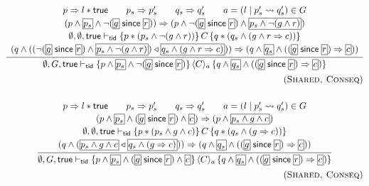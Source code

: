 \begin{figure*}
\footnotesize
\[
\begin{array}{@{}c@{}}
\infer
{
\emptyset,G,\true \vdash_\ltid 
\{p  \land \shared{p_s} \land\neg(\shared{g} \since \shared{r}) \} \,
\langle C\rangle_a \,
\{ q \land \shared{q_s}  \land ((\shared{g} \since \shareds{r}) \Rightarrow \shareds{c} ) \}    
}
{
\begin{array}{c}
p \Rightarrow l * \true
\qquad
p_s \Rightarrow p'_s
\qquad
q_s \Rightarrow q'_s
\qquad
a = (l \mid p'_s \leadsto q'_s) \in G 
\\[2pt]
(p  \land \shared{p_s} \land \neg(\shared{g} \since \shared{r})) 
\Rightarrow 
(p  \land \neg(\shared{g} \since \shared{r}) \land 
\shared{
 p_s 
 \land 
 \neg (g  \land r)
})
\\[2pt]
\emptyset,\emptyset,\true \vdash_\ltid 
\{ p * (p_s \land  \neg(g  \land r)) \}
\, C \,
\{ q * (q_s \land  (g \land r \Rightarrow c)) \}
\\[2pt]
(q \land (
(\neg(\shared{g} \since \shared{r}) \wedge 
\shared{p_s \land \neg(g  \land r)})
\extend 
\shared{q_s \land  (g \land r \Rightarrow c)}))
\Rightarrow 
(q \land \shared{q_s} \land  ((\shared{g} \since \shareds{r}) \Rightarrow \shareds{c}))
\end{array}
}
%
\\[5pt]
\hfill (\textsc{Shared, Conseq})
\\[4ex]
%
\infer
{
\emptyset,G,\true \vdash_\ltid 
\{p   \land \shared{p_s} \land (\shared{g} \since \shared{r}) \land  \shareds{c} \} \,
    \langle C \rangle_a\,
\{ q  \land \shared{q_s} \land ((\shared{g} \since \shared{r}) \Rightarrow \shareds{c})  \}    
}
{
\begin{array}{c}
p \Rightarrow l * \true
\qquad
p_s \Rightarrow p'_s
\qquad
q_s \Rightarrow q'_s
\qquad
a = (l \mid p'_s \leadsto q'_s)
\in G
\\[2pt]
(p  \land \shared{p_s} \land (\shared{g} \since \shared{r}) \land \shareds{c})
\Rightarrow 
(p  \land 
\shared{
 p_s 
 \land 
 g
\land
 c
})
\\[2pt]
\emptyset,\emptyset,\true \vdash_\ltid 
\{ p  * (p_s \land  g \land c) \}
\, C \,
\{ q * (q_s \land  (g \Rightarrow c)) \}
\\[2pt]
(q \wedge 
(\shared{p_s \land g \land c} 
\extend 
\shared{q_s \land (g \Rightarrow c)}))
\Rightarrow 
(q \wedge \shared{q_s} \land ((\shared{g} \since \shareds{r}) \Rightarrow \shareds{c}))
\end{array}
}
%
\\[5pt]
\hfill (\textsc{Shared, Conseq})

\end{array}\]
\end{figure*}
